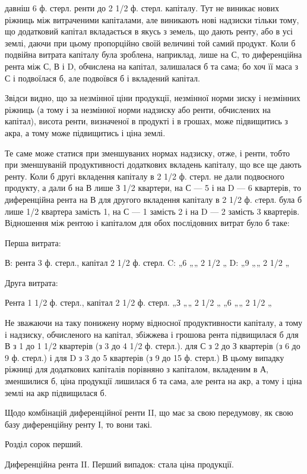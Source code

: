 давніш 6 ф. стерл. ренти до 2 1/2 ф. стерл. капіталу. Тут не виникає нових
ріжниць між витраченими капіталами, але виникають нові надзиски тільки
тому, що додатковий капітал вкладається в якусь з земель, що дають ренту,
або в усі землі, даючи при цьому пропорційно своїй величині той самий
продукт. Коли б подвійна витрата капіталу була зроблена, наприклад, лише
на С, то диференційна рента між С, В і D, обчислена на капітал, залишалася б
та сама; бо хоч її маса з С і подвоїлася б, але подвоївся б і вкладений
капітал.

Звідси видно, що за незмінної ціни продукції, незмінної норми зиску і
незмінних ріжниць (а тому і за незмінної норми надзиску або ренти, обчислених
на капітал), висота ренти, визначеної в продукті і в грошах, може підвищитись
з акра, а тому може підвищитись і ціна землі.

Те саме може статися при зменшуваних нормах надзиску, отже, і ренти,
тобто при зменшуваній продуктивності додаткових вкладень капіталу, що все
ще дають ренту. Коли б другі вкладення капіталу в 2 1/2 ф. стерл. не дали
подвоєного продукту, а дали б на В лише З 1/2 квартери, на С — 5 і на D —
6 квартерів, то диференційна рента на В для другого вкладення капіталу в 2 1/2 ф.
cтерл. була б лише 1/2 квартера замість 1, на С — 1 замість 2 і на D — 2 замість
3 квартерів. Відношення між рентою і капіталом для обох послідовних
витрат було б таке:

Перша витрата:

В: рента 3 ф. стерл., капітал 2 1/2 ф. стерл.
C: „6 „„ 2 1/2 „
D: „9 „„ 2 1/2 „

Друга витрата:

Рента 1 1/2 ф. стерл., капітал 2 1/2 ф. стерл.
„З „„ 2 1/2 „
„6 „„ 2 1/2 „

Не зважаючи на таку понижену норму відносної продуктивности капіталу,
а тому і надзиску, обчисленого на капітал, збіжжева і грошова рента підвищилася
б для В з 1 до 1 1/2 квартерів (з 3 до 4 1/2 ф. стерл.). для С з 2 до
З квартерів (з 6 до 9 ф. стерл.) і для D з 3 до 5 квартерів (з 9 до 15 ф. стерл.)
В цьому випадку ріжниці для додаткових капіталів порівняно з капіталом,
вкладеним в А, зменшилися б, ціна продукції лишилася б та сама, але рента
на акр, а тому і ціна землі на акр підвищилася б.

Щодо комбінацій диференційної ренти II, що має за свою передумову, як
свою базу диференційну ренту І, то вони такі.

Розділ сорок перший.

Диференційна рента II. Перший випадок: стала ціна
продукції.

